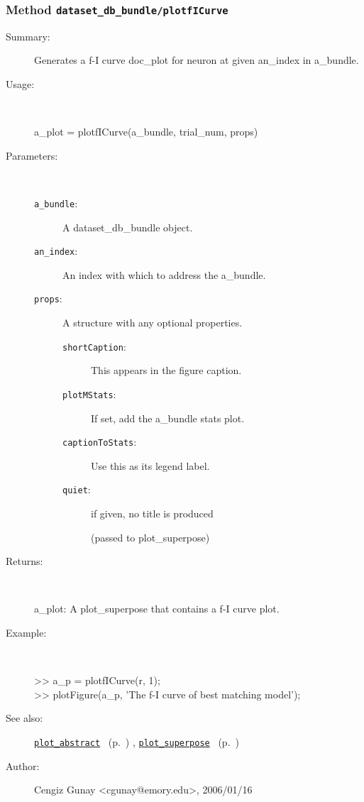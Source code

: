 \subsubsection[Method \texttt{plotfICurve}]{Method \texttt{dataset\_db\_bundle/plotfICurve}}%
%
\label{ref_dataset_db_bundle__plotfICurve}%
\hypertarget{ref_dataset_db_bundle__plotfICurve}{}%
\begin{description}
\item[Summary:]Generates a f-I curve doc\_plot for neuron at given an\_index in a\_bundle.
%
\item[Usage:]~%
\begin{lyxcode}%
a\_plot = plotfICurve(a\_bundle, trial\_num, props)
%
\end{lyxcode}%
%
%
\item[Parameters:]~
\begin{description}%
\item[\texttt{a\_bundle}:]
 A dataset\_db\_bundle object.
\item[\texttt{an\_index}:]
 An index with which to address the a\_bundle.
\item[\texttt{props}:]
 A structure with any optional properties.
\begin{description}%
\item[\texttt{shortCaption}:]
 This appears in the figure caption.
\item[\texttt{plotMStats}:]
 If set, add the a\_bundle stats plot.
\item[\texttt{captionToStats}:]
 Use this as its legend label. 
\item[\texttt{quiet}:]
 if given, no title is produced

(passed to plot\_superpose)\end{description}%
\end{description}%
%
\item[Returns:]~

	a\_plot: A plot\_superpose that contains a f-I curve plot.
%
\item[Example:]~
\begin{lyxcode} >> a\_p = plotfICurve(r, 1);\\%
 >> plotFigure(a\_p, 'The f-I curve of best matching model');\\%
\end{lyxcode}
%
\item[See also:]%
\hyperlink{ref_plot_abstract}{\texttt{plot\_abstract}}%
\ (p.~\pageref{ref_plot_abstract})%
%
, \hyperlink{ref_plot_superpose}{\texttt{plot\_superpose}}%
\ (p.~\pageref{ref_plot_superpose})%
%
%
\item[Author:]%
Cengiz Gunay <cgunay@emory.edu>, 2006/01/16%
\end{description}
\methodline%
